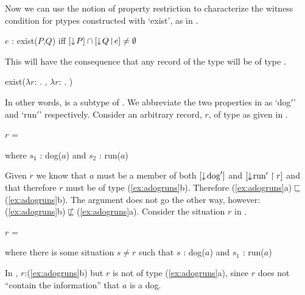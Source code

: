 Now we can use the notion of property restriction to characterize the
witness condition for ptypes constructed with `exist', as in
\nexteg{}.
\begin{ex} 
$e$ : exist($P$,$Q$) iff $[\downarrow\!P]\cap[\downarrow\!Q\!\restriction\! e]\not=\emptyset$ 
\label{ex:existwitcond}
\end{ex} 
This will have the consequence that any record of the type 
will be of type .
\begin{ex} 
\begin{subex} 
 
\item {}
 
\item exist($\lambda r$:
    . ,
            $\lambda r$: . )
 
\end{subex} 
\label{ex:adogruns}
   
\end{ex} 
In other words,  is a subtype of .  We abbreviate
the two properties in  as `dog$'$' and `run$'$'
respectively.  Consider an
arbitrary record, $r$, of type  as given in \nexteg{}.
\begin{ex} 
$r$ = 

\medskip

where $s_1$ : dog($a$) and $s_2$ : run($a$)
\end{ex} 
Given $r$ we know that $a$ must be a member of both
$[\downarrow\!\text{dog}']$ and $[\downarrow\!\text{run}'\restriction r]$ and that
therefore $r$ must be of type (\ref{ex:adogruns}b).  Therefore
(\ref{ex:adogruns}a)$\sqsubseteq$(\ref{ex:adogruns}b).  The argument does
not go the other way,
however: (\ref{ex:adogruns}b)$\not\sqsubseteq$(\ref{ex:adogruns}a).  Consider
the situation $r$ in \nexteg{}.
\begin{ex} 
$r$ = 

\medskip

where there is some situation $s\not=r$ such that $s$ : dog($a$) and $s_1$ : run($a$) 
\end{ex} 
In \preveg{}, $r$:(\ref{ex:adogruns}b) but $r$ is not of type
(\ref{ex:adogruns}a), since $r$ does not ``contain the information'' that
$a$ is a dog.  

